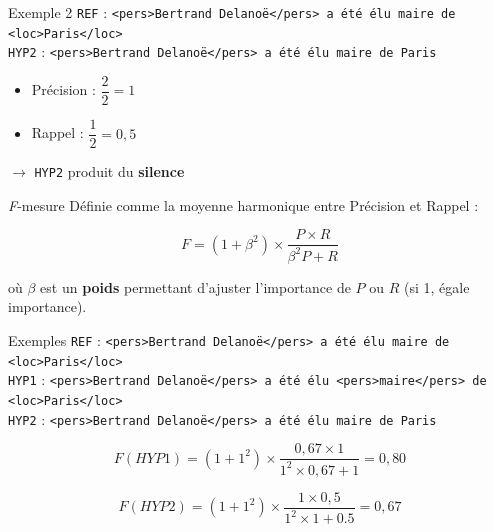 \documentclass[xetex,xcolor={table,usenames,dvipsnames}]{beamer}
\newcommand{\bolder}[1]{{\color{purple}\bfseries#1}}
\begin{document}
\begin{frame}{Exemple 2}
	\textcolor{deepred}{\texttt{REF}} : \texttt{<pers>Bertrand Delanoë</pers> a été élu maire de <loc>Paris</loc>}\\\medskip
	\textcolor{deepblue}{\texttt{HYP2}} :  \texttt{<pers>Bertrand Delanoë</pers> a été élu maire de Paris}
	
		\begin{itemize}
		\item Précision : $\dfrac{2}{2} = 1$
		\item Rappel :  $\dfrac{1}{2} = 0,5$
	\end{itemize}
	
	$\rightarrow$ \texttt{HYP2} produit du \bolder{silence}


	
\end{frame}

\begin{frame}{\textit{F}-mesure}
	Définie comme la moyenne harmonique entre Précision et Rappel :
	
	\begin{equation*}
		F = (1 + \beta^2) \times \dfrac{P \times R}{\beta^2 P + R}
	\end{equation*}
	
	où $\beta$ est un \textcolor{deepblue}{\textbf{poids}} permettant d'ajuster l'importance de $P$ ou $R$ (si 1, égale importance).
\end{frame}

\begin{frame}{Exemples}
		\textcolor{deepred}{\texttt{REF}} : \texttt{<pers>Bertrand Delanoë</pers> a été élu maire de <loc>Paris</loc>}\\\medskip
			\textcolor{deepblue}{\texttt{HYP1}} :  \texttt{<pers>Bertrand Delanoë</pers> a été élu <pers>maire</pers> de <loc>Paris</loc>}\\\medskip
	\textcolor{deepblue}{\texttt{HYP2}} :  \texttt{<pers>Bertrand Delanoë</pers> a été élu maire de Paris}
	
	\begin{equation*}
		F(HYP1) = (1 + 1^2) \times \dfrac{0,67 \times 1}{1^2 \times 0,67 + 1} = 0,80
	\end{equation*}
	
	\begin{equation*}
		F(HYP2) = (1 + 1^2) \times \dfrac{1 \times 0,5}{1^2 \times 1 + 0.5} = 0,67
	\end{equation*}
\end{frame}
\end{document}
